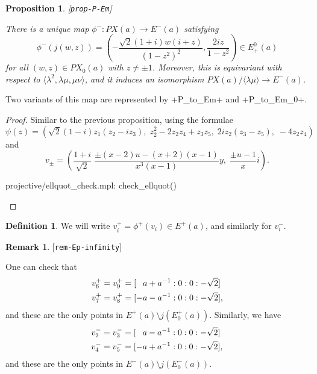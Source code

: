 \documentclass[reqno]{amsart}
\newcommand{\lbl}[1]{\label{#1}\textup{[\texttt{#1}]}\par}
\newcommand{\lbl}{\label}
\newcommand{\lm}        {\lambda}
\newcommand{\ip}[1]     {\langle #1\rangle}
\newcommand{\sm}        {\setminus}
\newcommand{\rt}        {\sqrt{2}}
\newcommand{\pp}        {\hphantom{+}}
\renewcommand{\:}{\colon}
\newtheorem{proposition}[theorem]{Proposition}
\theoremstyle{definition}
\newtheorem{remark}[theorem]{Remark}
\newtheorem{definition}[theorem]{Definition}
\begin{document}
\begin{proposition}\lbl{prop-P-Em}
 There is a unique map $\phi^-\:PX(a)\to E^-(a)$ satisfying
 \[ \phi^-(j(w,z)) = \left(-\frac{\rt(1+i)w(i+z)}{(1-z^2)^2},
                           \frac{2iz}{1-z^2}\right) \in E^0_+(a)
 \]
 for all $(w,z)\in PX_0(a)$ with $z\neq\pm 1$.  Moreover, this is
 equivariant with respect to $\ip{\lm^2,\lm\mu,\mu\nu}$, and it
 induces an isomorphism $PX(a)/\ip{\lm\mu}\to E^-(a)$.
\end{proposition}
Two variants of this map are represented by \mcode+P_to_Em+ and
\mcode+P_to_Em_0+.
\begin{proof}
 Similar to the previous proposition, using the formulae
 \[ \psi(z) = (\rt (1-i)z_1(z_2-iz_3),\;
               z_2^2-2z_2z_4+z_3z_5,\;
               2iz_2(z_3-z_5),\;
               -4z_2z_4)
 \]
 and
 \[ v_{\pm} = \left(
     \frac{1+i}{\rt}\;\frac{\pm(x-2)u-(x+2)(x-1)}{x^3(x-1)}y,\;
     \frac{\pm u-1}{x}i
    \right).
 \]
 \begin{checks}
  projective/ellquot_check.mpl: check_ellquot()
 \end{checks}
\end{proof}

\begin{definition}
 We will write $v_i^+=\phi^+(v_i)\in E^+(a)$, and similarly for
 $v_i^-$.
\end{definition}

\begin{remark}\lbl{rem-Ep-infinity}
 One can check that
 \begin{align*}
  v^+_6 = v^+_9 &= [\pp a+a^{-1}:0:0:-\rt] \\
  v^+_7 = v^+_8 &= [   -a-a^{-1}:0:0:-\rt],
 \end{align*}
 and these are the only points in $E^+(a)\sm j(E^+_0(a))$.  Similarly,
 we have
 \begin{align*}
  v^-_2 = v^-_3 &= [\pp a-a^{-1}:0:0:-\rt] \\
  v^-_4 = v^-_5 &= [   -a+a^{-1}:0:0:-\rt],
 \end{align*}
 and these are the only points in $E^-(a)\sm j(E^-_0(a))$.
\end{remark}
\end{document}
